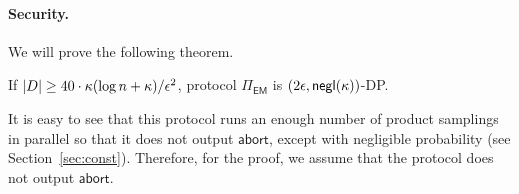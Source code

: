 \paragraph{Security.}
We will prove the following theorem.

\begin{theorem}\label{thm:prodDP}
If $|D| \ge 40 \cdot \kappa (\log n + \kappa)/\epsilon^2$,
protocol $\Pi_{\mathsf{EM}}$ is
$(2\epsilon,\mathsf{negl}(\kappa))$-DP.
\end{theorem}

It is easy to see that this protocol runs an enough number of product
samplings in parallel so that it does not output $\mathsf{abort}$,
except with negligible probability  (see Section~\ref{sec:const}).
Therefore, for the proof, we assume that the protocol does not output
$\mathsf{abort}$.  

%
%
%
%

